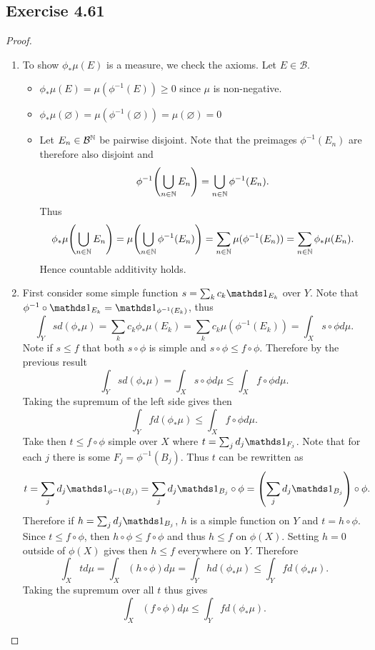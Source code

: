 \documentclass[hw_all.tex]{subfiles}
\begin{document}
\subsection{Exercise 4.61}

\begin{proof}
    \begin{enumerate}
        \item
            To show $\phi_* \mu(E)$ is a measure, we check the axioms. Let $E \in \mathcal{B}$.
            \begin{itemize}
                \item $\phi_* \mu(E) = \mu(\phi^{-1}(E)) \geq 0$ since $\mu$ is non-negative.
                \item $\phi_* \mu(\varnothing) = \mu(\phi^{-1}(\varnothing)) = \mu(\varnothing) = 0$
                \item Let $E_n \in \mathcal{B}^{\mathbb{N}}$ be pairwise disjoint. Note that the preimages $\phi^{-1}(E_n)$ are therefore also disjoint and
                    \[
                        \phi^{-1}\qty(\bigcup_{n \in \mathbb{N}} E_n) = \bigcup_{n \in \mathbb{N}} \phi^{-1}(E_n)
                    .\]
                    Thus
                    \[
                        \phi_* \mu\qty(\bigcup_{n \in \mathbb{N}} E_n) = \mu\qty(\bigcup_{n \in \mathbb{N}} \phi^{-1}(E_n)) = \sum_{n \in \mathbb{N}} \mu(\phi^{-1}(E_n)) = \sum_{n \in \mathbb{N}} \phi_* \mu(E_n)
                    .\]
                    Hence countable additivity holds.
            \end{itemize}

        \item 
            First consider some simple function $s = \sum_{k} c_k \ind{E_k}$ over $Y$. Note that $\phi^{-1}\circ\ind{E_k} = \ind{\phi^{-1}(E_k)}$, thus
            \[
                \int_Y s d(\phi_* \mu) = \sum_{k} c_k \phi_* \mu(E_k) = \sum_{k} c_k \mu(\phi^{-1}(E_k)) = \int_X s \circ \phi d \mu
            .\]
            Note if $s \leq f$ that both $s \circ \phi$ is simple and $s \circ \phi \leq f \circ \phi$. Therefore by the previous result
            \[
                \int_Y s d(\phi_* \mu) = \int_X s \circ \phi d \mu \leq \int_X f \circ \phi d \mu
            .\]
            Taking the supremum of the left side gives then
            \[
                \int_Y f d(\phi_* \mu) \leq \int_X f \circ \phi d \mu
            .\]
            Take then $t \leq f \circ \phi$ simple over $X$ where $t = \sum_{j} d_j \ind{F_j}$. Note that for each $j$ there is some $F_j = \phi^{-1}(B_j)$. Thus $t$ can be rewritten as
            \[
                t = \sum_{j} d_j \ind{\phi^{-1}(B_j)} = \sum_{j} d_j \ind{B_j} \circ \phi = \qty(\sum_j d_j \ind{B_j}) \circ \phi
            .\]
            Therefore if $h = \sum_{j} d_j \ind{B_j}$, $h$ is a simple function on $Y$ and $t = h \circ \phi$. Since $t \leq f \circ \phi$, then $h \circ \phi \leq f \circ \phi$ and thus $h \leq f$ on $\phi(X)$. Setting $h = 0$ outside of $\phi(X)$ gives then $h \leq f$ everywhere on $Y$. Therefore
            \[
                \int_X t d \mu = \int_X (h \circ \phi) d \mu = \int_Y h d(\phi_* \mu) \leq \int_Y f d(\phi_* \mu)
            .\]
            Taking the supremum over all $t$ thus gives
            \[
                \int_X (f \circ \phi) d \mu \leq \int_Y f d(\phi_* \mu)
            .\]


\end{enumerate}
\end{proof}
\end{document}
